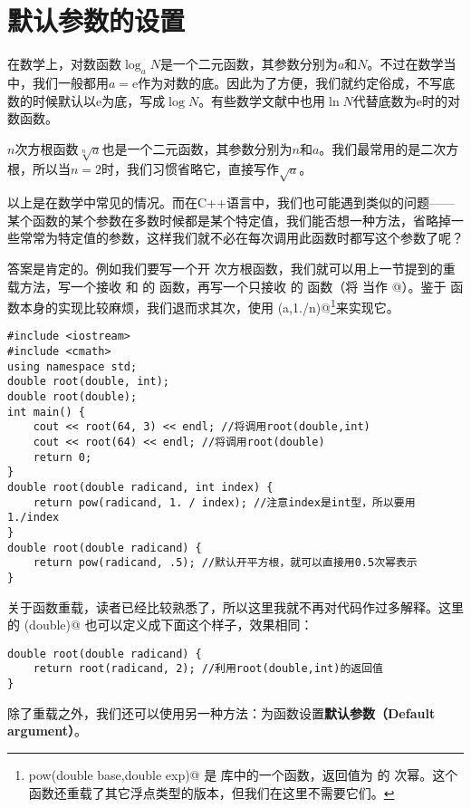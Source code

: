 \section{默认参数的设置}
在数学上，对数函数$\log_aN$是一个二元函数，其参数分别为$a$和$N$。不过在数学当中，我们一般都用$a=\mathrm{e}$作为对数的底。因此为了方便，我们就约定俗成，不写底数的时候默认以$\mathrm{e}$为底，写成$\log{N}$。有些数学文献中也用$\ln{N}$代替底数为$\mathrm{e}$时的对数函数。\par
$n$次方根函数$\sqrt[n]{a}$也是一个二元函数，其参数分别为$n$和$a$。我们最常用的是二次方根，所以当$n=2$时，我们习惯省略它，直接写作$\sqrt{a}$。\par
以上是在数学中常见的情况。而在C++语言中，我们也可能遇到类似的问题——某个函数的某个参数在多数时候都是某个特定值，我们能否想一种方法，省略掉一些常常为特定值的参数，这样我们就不必在每次调用此函数时都写这个参数了呢？\par
答案是肯定的。例如我们要写一个开 \lstinline@n@ 次方根函数，我们就可以用上一节提到的重载方法，写一个接收 \lstinline@a@ 和 \lstinline@n@ 的 \lstinline@root@ 函数，再写一个只接收 \lstinline@a@ 的 \lstinline@root@ 函数（将 \lstinline@n@ 当作 @）。鉴于 \lstinline@root@ 函数本身的实现比较麻烦，我们退而求其次，使用 \lstinline@pow(a,1./n)@\footnote{\lstinline@double pow(double base,double exp)@ 是 \lstinline@cmath@ 库中的一个函数，返回值为 \lstinline@base@ 的 \lstinline@exp@ 次幂。这个函数还重载了其它浮点类型的版本，但我们在这里不需要它们。}来实现它。\par
\begin{lstlisting}
#include <iostream>
#include <cmath>
using namespace std;
double root(double, int);
double root(double);
int main() {
    cout << root(64, 3) << endl; //将调用root(double,int)
    cout << root(64) << endl; //将调用root(double)
    return 0;
}
double root(double radicand, int index) {
    return pow(radicand, 1. / index); //注意index是int型，所以要用1./index
}
double root(double radicand) {
    return pow(radicand, .5); //默认开平方根，就可以直接用0.5次幂表示
}
\end{lstlisting}
关于函数重载，读者已经比较熟悉了，所以这里我就不再对代码作过多解释。这里的 \lstinline@root(double)@ 也可以定义成下面这个样子，效果相同：
\begin{lstlisting}
double root(double radicand) {
    return root(radicand, 2); //利用root(double,int)的返回值
}
\end{lstlisting}\par
除了重载之外，我们还可以使用另一种方法：为函数设置\textbf{默认参数（Default argument）}。\par

